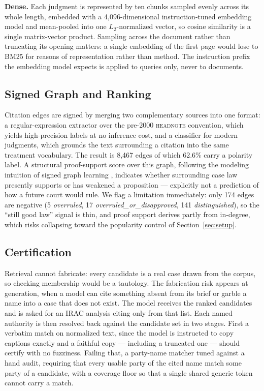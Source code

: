 \documentclass[10pt,conference]{IEEEtran}
\begin{document}
\textbf{Dense.} Each judgment is represented by ten chunks sampled evenly across its whole
length, embedded with a 4{,}096-dimensional instruction-tuned embedding model and mean-pooled
into one $L_2$-normalized vector, so cosine similarity is a single matrix-vector product.
Sampling across the document rather than truncating its opening matters: a single embedding
of the first page would lose to BM25 for reasons of representation rather than method. The
instruction prefix the embedding model expects is applied to queries only, never to
documents.

\subsection{Signed Graph and Ranking}

Citation edges are signed by merging two complementary sources into one format: a
regular-expression extractor over the pre-2000 \textsc{headnote} convention, which yields
high-precision labels at no inference cost, and a classifier for modern judgments, which
grounds the text surrounding a citation into the same treatment vocabulary. The result is
8{,}467 edges of which 62.6\% carry a polarity label. A structural proof-support score over
this graph, following the modeling intuition of signed graph learning \cite{derr2018},
indicates whether surrounding case law presently supports or has weakened a proposition ---
explicitly not a prediction of how a future court would rule. We flag a limitation
immediately: only 174 edges are negative (5 \emph{overruled}, 17
\emph{overruled\_or\_disapproved}, 141 \emph{distinguished}), so the ``still good law''
signal is thin, and proof support derives partly from in-degree, which risks collapsing
toward the popularity control of Section~\ref{sec:setup}.

\subsection{Certification}

Retrieval cannot fabricate: every candidate is a real case drawn from the corpus, so
checking membership would be a tautology. The fabrication risk appears at generation, when
a model can cite something absent from its brief or garble a name into a case that does not
exist. The model receives the ranked candidates and is asked for an IRAC analysis citing
only from that list. Each named authority is then resolved back against the candidate set in
two stages. First a verbatim match on normalized text, since the model is instructed to copy
captions exactly and a faithful copy --- including a truncated one --- should certify with no
fuzziness. Failing that, a party-name matcher tuned against a hand audit, requiring that
every usable party of the cited name match some party of a candidate, with a coverage floor
so that a single shared generic token cannot carry a match.
\end{document}
